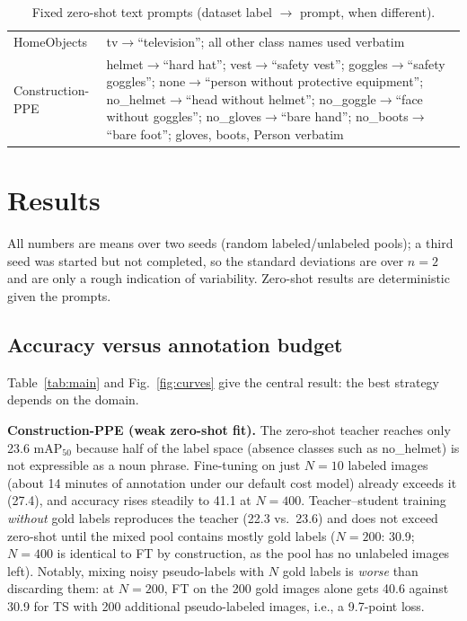 \documentclass[conference]{IEEEtran}
\begin{document}
\begin{table}[t]
\caption{Fixed zero-shot text prompts (dataset label $\rightarrow$ prompt, when different).}
\label{tab:prompts}
\centering\footnotesize
\begin{tabular}{p{0.9in}p{2.3in}}
\toprule
HomeObjects & tv$\rightarrow$``television''; all other class names used verbatim\\
Construction-PPE & helmet$\rightarrow$``hard hat''; vest$\rightarrow$``safety vest''; goggles$\rightarrow$``safety goggles''; none$\rightarrow$``person without protective equipment''; no\_helmet$\rightarrow$``head without helmet''; no\_goggle$\rightarrow$``face without goggles''; no\_gloves$\rightarrow$``bare hand''; no\_boots$\rightarrow$``bare foot''; gloves, boots, Person verbatim\\
\bottomrule
\end{tabular}
\end{table}
\section{Results}
All numbers are means over two seeds (random labeled/unlabeled pools); a third seed was started but not completed, so the standard deviations are over $n{=}2$ and are only a rough indication of variability. Zero-shot results are deterministic given the prompts.

\subsection{Accuracy versus annotation budget}
Table~\ref{tab:main} and Fig.~\ref{fig:curves} give the central result: the best strategy depends on the domain.

\textbf{Construction-PPE (weak zero-shot fit).} The zero-shot teacher reaches only 23.6 mAP$_{50}$ because half of the label space (absence classes such as no\_helmet) is not expressible as a noun phrase. Fine-tuning on just $N{=}10$ labeled images (about 14 minutes of annotation under our default cost model) already exceeds it (27.4), and accuracy rises steadily to 41.1 at $N{=}400$. Teacher--student training \emph{without} gold labels reproduces the teacher (22.3 vs.\ 23.6) and does not exceed zero-shot until the mixed pool contains mostly gold labels ($N{=}200$: 30.9; $N{=}400$ is identical to FT by construction, as the pool has no unlabeled images left). Notably, mixing noisy pseudo-labels with $N$ gold labels is \emph{worse} than discarding them: at $N{=}200$, FT on the 200 gold images alone gets 40.6 against 30.9 for TS with 200 additional pseudo-labeled images, i.e., a 9.7-point loss.
\end{document}
